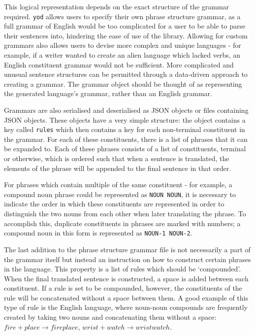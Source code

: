 \documentclass{report}
\begin{document}
	This logical representation depends on the exact structure of the grammar required. \texttt{yod} allows users to specify their own phrase structure grammar, as a full grammar of English would be too complicated for a user to be able to parse their sentences into, hindering the ease of use of the library. Allowing for custom grammars also allows users to devise more complex and unique languages - for example, if a writer wanted to create an alien language which lacked verbs, an English constituent grammar would not be sufficient. More complicated and unusual sentence structures can be permitted through a data-driven approach to creating a grammar. The grammar object should be thought of as representing the generated language's grammar, rather than an English grammar.
	
	Grammars are also serialised and deserialised as JSON objects or files containing JSON objects. These objects have a very simple structure: the object contains a key called \texttt{rules} which then contains a key for each non-terminal constituent in the grammar. For each of these constituents, there is a list of phrases that it can be expanded to. Each of these phrases consists of a list of constituents, terminal or otherwise, which is ordered such that when a sentence is translated, the elements of the phrase will be appended to the final sentence in that order.
	
	For phrases which contain multiple of the same constituent - for example, a compound noun phrase could be represented as \texttt{NOUN NOUN}, it is necessary to indicate the order in which these constituents are represented in order to distinguish the two nouns from each other when later translating the phrase. To accomplish this, duplicate constituents in phrases are marked with numbers; a compound noun in this form is represented as \texttt{NOUN-1 NOUN-2}.
	
	The last addition to the phrase structure grammar file is not necessarily a part of the grammar itself but instead an instruction on how to construct certain phrases in the language. This property is a list of rules which should be `compounded'. When the final translated sentence is constructed, a space is added between each constituent. If a rule is set to be compounded, however, the constituents of the rule will be concatenated without a space between them. A good example of this type of rule is the English language, where noun-noun compounds are frequently created by taking two nouns and concatenating them without a space: $fire + place \rightarrow fireplace$, $wrist + watch \rightarrow wristwatch$.
\end{document}
